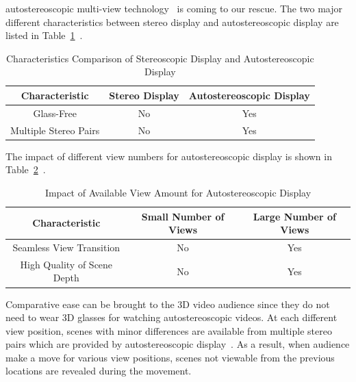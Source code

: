 autostereoscopic multi-view technology~\parencite{RN153} is coming to
our rescue.
The two major different characteristics between stereo display and
autostereoscopic display are
listed in Table~\ref{tab:diff-stereo-autostereo}~\parencite{RN44}.
\begin{table}[b]
    \caption{Characteristics Comparison of Stereoscopic Display and Autostereoscopic Display}
    \bigskip
    \label{tab:diff-stereo-autostereo}
    \centering
    \begin{tabular}{c c c}
        \hline
        Characteristic & Stereo Display & Autostereoscopic Display\\
        \hline
        Glass-Free & No & Yes \\
        Multiple Stereo Pairs & No & Yes \\
        \hline
    \end{tabular}
\end{table}
The impact of different view numbers for autostereoscopic display is shown in
Table~\ref{tab:autostereo-less-views-more-views}~\parencite{RN44}.
\begin{table}
    \caption{Impact of Available View Amount for Autostereoscopic Display}
    \bigskip
    \label{tab:autostereo-less-views-more-views}
    \centering
    \begin{tabular}{c c c}
        \hline
        Characteristic & Small Number of Views & Large Number of Views \\
        \hline
        Seamless View Transition  & No & Yes \\
        High Quality of Scene Depth & No & Yes \\
        \hline
    \end{tabular}
\end{table}
Comparative ease can be brought to the 3D video audience
since they do not need to wear 3D glasses for watching autostereoscopic videos.
At each different view position, scenes with minor differences are available
from multiple stereo pairs which are provided by autostereoscopic
display~\parencite{RN44}.
As a result, when audience make a move for various view positions, scenes
not viewable from the previous locations are revealed during the movement.
